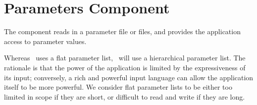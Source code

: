 \section{Parameters Component} \label{s:component-parameters}

The  component reads in a parameter file or files, and
provides the application access to parameter values.

Whereas \enzo\ uses a flat parameter list, \cello\ will use a
hierarchical parameter list.  The rationale is that the power of the
application is limited by the expressiveness of its input; conversely,
a rich and powerful input language can allow the application itself to
be more powerful.  We consider flat parameter lists to be either too
limited in scope if they are short, or difficult to read and write if
they are long.

